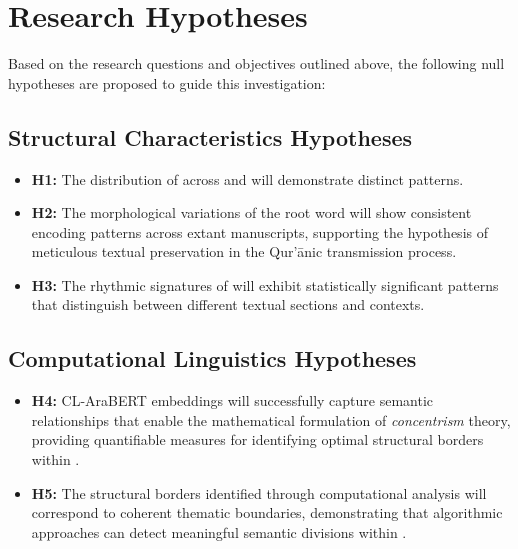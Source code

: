 \section{Research Hypotheses}\label{sec:hypotheses}

Based on the research questions and objectives outlined above, the following null hypotheses are proposed to guide this investigation:

\subsection{Structural Characteristics Hypotheses}
\begin{itemize}
    \item \textbf{H1:} The distribution of   across   and  \newline will demonstrate distinct patterns.

    \item \textbf{H2:} The morphological variations of the root word   will show consistent encoding patterns across extant manuscripts, supporting the hypothesis of meticulous textual preservation in the Qur'\=anic transmission process.
    
    \item \textbf{H3:} The rhythmic signatures of   will exhibit statistically significant patterns that distinguish between different textual sections and contexts.
\end{itemize}

\subsection{Computational Linguistics Hypotheses}
\begin{itemize}
    \item \textbf{H4:} CL-AraBERT embeddings will successfully capture semantic relationships that enable the mathematical formulation of \textit{concentrism} theory, providing quantifiable measures for identifying optimal structural borders within  .

    \item \textbf{H5:} The structural borders identified through computational analysis will correspond to coherent thematic boundaries, demonstrating that algorithmic approaches can detect meaningful semantic divisions within  .
\end{itemize}

